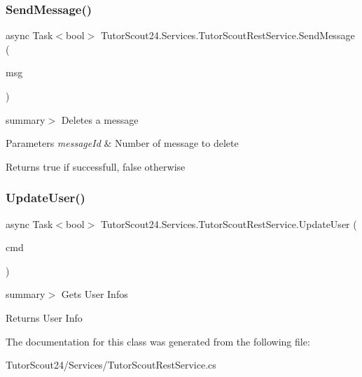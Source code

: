 \subsubsection{\texorpdfstring{Send\+Message()}{SendMessage()}}
{\footnotesize\ttfamily async Task$<$bool$>$ Tutor\+Scout24.\+Services.\+Tutor\+Scout\+Rest\+Service.\+Send\+Message (\begin{DoxyParamCaption}\item[{\mbox{\hyperlink{class_tutor_scout24_1_1_models_1_1_chat_1_1_send_message}{Send\+Message}}}]{msg }\end{DoxyParamCaption})\hspace{0.3cm}{\ttfamily [inline]}}

summary$>$ Deletes a message 


\begin{DoxyParams}{Parameters}
{\em message\+Id} & Number of message to delete\\
\hline
\end{DoxyParams}
\begin{DoxyReturn}{Returns}
true if successfull, false otherwise
\end{DoxyReturn}
\mbox{\label{class_tutor_scout24_1_1_services_1_1_tutor_scout_rest_service_a6f94210e708fe30a18c712db702d13d9}} 
\subsubsection{\texorpdfstring{Update\+User()}{UpdateUser()}}
{\footnotesize\ttfamily async Task$<$bool$>$ Tutor\+Scout24.\+Services.\+Tutor\+Scout\+Rest\+Service.\+Update\+User (\begin{DoxyParamCaption}\item[{\mbox{\hyperlink{class_tutor_scout24_1_1_models_1_1_rest_command_with_authentication}{Rest\+Command\+With\+Authentication}}}]{cmd }\end{DoxyParamCaption})\hspace{0.3cm}{\ttfamily [inline]}}

summary$>$ Gets User Infos 

\begin{DoxyReturn}{Returns}
User Info
\end{DoxyReturn}


The documentation for this class was generated from the following file\+:\begin{DoxyCompactItemize}
\item 
Tutor\+Scout24/\+Services/Tutor\+Scout\+Rest\+Service.\+cs\end{DoxyCompactItemize}
